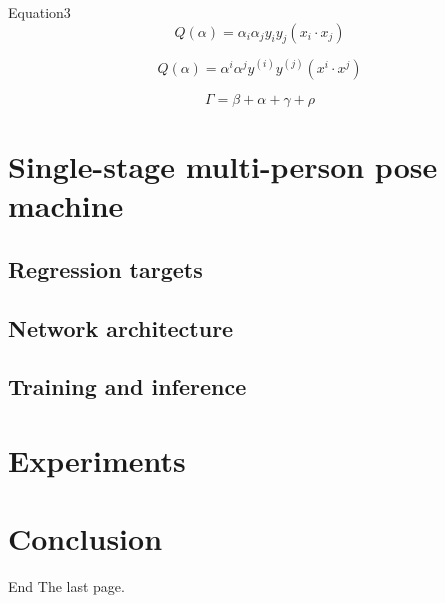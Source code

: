 \begin{frame}{Equation3}
    $$Q(\alpha)=\alpha_i\alpha_jy_iy_j(x_i\cdot x_j)$$

    $$Q(\alpha)=\alpha^i\alpha^jy^{(i)}y^{(j)}(x^i\cdot x^j)$$
    
    $$\Gamma=\beta+\alpha+\gamma+\rho$$
\end{frame}


\section{Single-stage multi-person pose machine}
\subsection{Regression targets}
\subsection{Network architecture}
\subsection{Training and inference}

\section{Experiments}

\section{Conclusion}

\begin{frame}{End}
    The last page.
\end{frame}